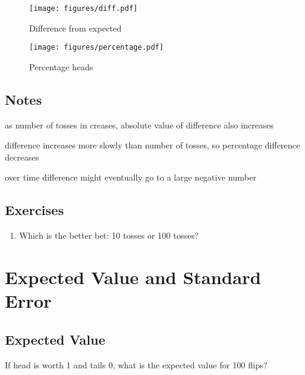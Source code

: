 \documentclass[letterpaper]{exam}
\begin{document}
  \begin{figure}[H]
    \centering
    \texttt{[image: figures/diff.pdf]}
    \caption{Difference from expected}\label{fig:diff}
  \end{figure}

  \begin{figure}[H]
    \centering
    \texttt{[image: figures/percentage.pdf]}
    \caption{Percentage heads}\label{fig:percentage}
  \end{figure}

  \subsection{Notes}
  \begin{itemize*}
    \item as number of tosses in creases, absolute value of difference also
      increases
    \item difference increases more slowly than number of tosses, so percentage
      difference decreases
    \item over time difference might eventually go to a large negative number
  \end{itemize*}

  \subsection{Exercises}

  \begin{enumerate}
    \item Which is the better bet: 10 tosses or 100 tosses?
  \end{enumerate}

  \section{Expected Value and Standard Error}
  \subsection{Expected Value}
  If head is worth 1 and tails 0, what is the expected value for 100 flips?
\end{document}
